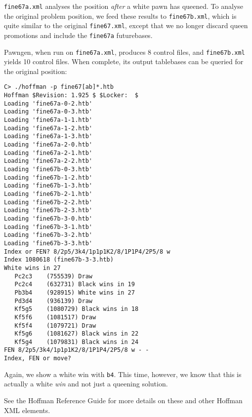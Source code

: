 \documentclass[11pt]{article}
\begin{document}
{\tt fine67a.xml} analyses the position {\it after} a white pawn has
queened.  To analyse the original problem position, we feed these
results to {\tt fine67b.xml}, which is quite similar to the original
{\tt fine67.xml}, except that we no longer discard queen promotions
and include the {\tt fine67a} futurebases.

Pawngen, when run on {\tt fine67a.xml}, produces 8 control files, and
{\tt fine67b.xml} yields 10 control files.  When complete, its output
tablebases can be queried for the original position:

\begin{verbatim}
C> ./hoffman -p fine67[ab]*.htb
Hoffman $Revision: 1.925 $ $Locker:  $
Loading 'fine67a-0-2.htb'
Loading 'fine67a-0-3.htb'
Loading 'fine67a-1-1.htb'
Loading 'fine67a-1-2.htb'
Loading 'fine67a-1-3.htb'
Loading 'fine67a-2-0.htb'
Loading 'fine67a-2-1.htb'
Loading 'fine67a-2-2.htb'
Loading 'fine67b-0-3.htb'
Loading 'fine67b-1-2.htb'
Loading 'fine67b-1-3.htb'
Loading 'fine67b-2-1.htb'
Loading 'fine67b-2-2.htb'
Loading 'fine67b-2-3.htb'
Loading 'fine67b-3-0.htb'
Loading 'fine67b-3-1.htb'
Loading 'fine67b-3-2.htb'
Loading 'fine67b-3-3.htb'
Index or FEN? 8/2p5/3k4/1p1p1K2/8/1P1P4/2P5/8 w
Index 1080618 (fine67b-3-3.htb)
White wins in 27
   Pc2c3    (755539) Draw
   Pc2c4    (632731) Black wins in 19
   Pb3b4    (928915) White wins in 27
   Pd3d4    (936139) Draw
   Kf5g5    (1080729) Black wins in 18
   Kf5f6    (1081517) Draw
   Kf5f4    (1079721) Draw
   Kf5g6    (1081627) Black wins in 22
   Kf5g4    (1079831) Black wins in 24
FEN 8/2p5/3k4/1p1p1K2/8/1P1P4/2P5/8 w - -
Index, FEN or move? 
\end{verbatim}

Again, we show a white win with {\tt b4}.  This time, however, we know
that this is actually a white {\it win} and not just a queening
solution.



See the Hoffman Reference Guide for more details on these and other
 Hoffman XML elements.
\end{document}
